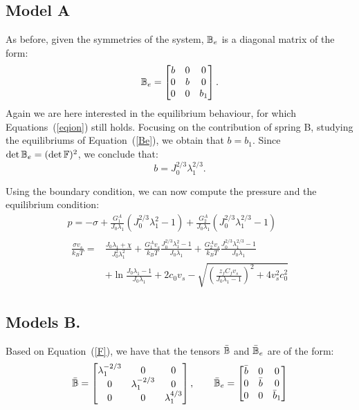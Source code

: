 \subsection{Model A}
As before, given the symmetries of the system, $\mathbb{B}_e$ is a diagonal matrix of the form:
\begin{equation}
\mathbb{B}_e=\begin{bmatrix}
b &0&0\\
0&b&0\\
0&0& b_1
\end{bmatrix}. 
\end{equation}
Again we are here interested in the equilibrium behaviour, for which Equations~(\ref{eqion}) still holds. Focusing on the contribution of spring B, studying the equilibriums of Equation~(\ref{Be}), we obtain that $b=b_1$. Since $\det \mathbb{B}_e= (\det \mathbb{F})^2$, we conclude that:
\begin{equation}
b = J_0^{2/3}\lambda_1^{2/3}.
\end{equation}

Using the boundary condition, we can now compute the pressure and the equilibrium condition:
\begin{gather}
p = -\sigma + \frac{G^A_1}{J_0\lambda_1} (J^{2/3}_0\lambda_1^2-1)+\frac{G^A_2}{J_0\lambda_1} (J_0^{2/3} \lambda_1^{2/3}-1) \\
\begin{aligned}
\frac{\sigma v_s}{k_B T}=&\frac{J_0\lambda_1+\chi}{J_0^2\lambda^2_1}+\frac{G_1^Av_s}{k_BT} \frac{J_0^{2/3}\lambda^2_1-1}{J_0 \lambda_1}+\frac{G_2^Av_s}{k_BT} \frac{J_0^{2/3}\lambda^{2/3}_1-1}{J_0 \lambda_1}\\[1.5mm]
&+\ln \frac{J_0\lambda_1-1}{J_0\lambda_1} +2c_0v_s-\sqrt{\left(\frac{z_fC_fv_s}{J_0\lambda_1-1}\right)^2+4v_s^2c^2_0}\label{compA}
\end{aligned}
\end{gather}

\subsection{Models B.}
Based on Equation~(\ref{F}), we have that the tensors $\bar{\mathbb{B}}$ and $\bar{\mathbb{B}}_e$ are of the form:
\begin{equation}
\bar{\mathbb{B}}=\begin{bmatrix}
\lambda_1^{-2/3} &0&0\\
0&\lambda_1^{-2/3}&0\\
0&0& \lambda_1^{4/3}
\end{bmatrix}, \qquad
\bar{\mathbb{B}}_e=\begin{bmatrix}
\bar{b} &0&0\\
0&\bar{b}&0\\
0&0& \bar{b}_1
\end{bmatrix}
\end{equation}

